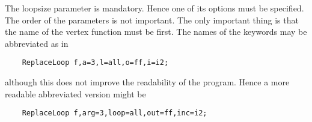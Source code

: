 

\noindent The loopsize parameter is mandatory. Hence one of 
its options must be specified. The order of the parameters is not 
important. The only important thing is that the name of the vertex function 
must be first. The names of the keywords may be abbreviated as in
\begin{verbatim}
    ReplaceLoop f,a=3,l=all,o=ff,i=i2;
\end{verbatim}
although this does not improve the readability of the program. Hence a more 
readable abbreviated version might be
\begin{verbatim}
    ReplaceLoop f,arg=3,loop=all,out=ff,inc=i2;
\end{verbatim}

